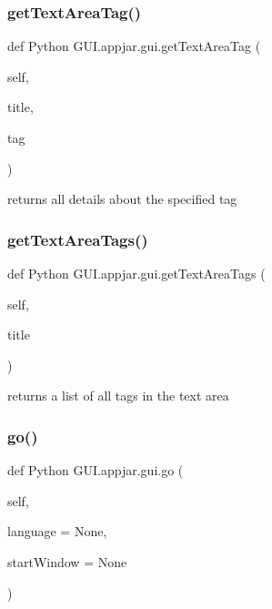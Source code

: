 \subsubsection{\texorpdfstring{get\+Text\+Area\+Tag()}{getTextAreaTag()}}
{\footnotesize\ttfamily def Python G\+U\+I.\+appjar.\+gui.\+get\+Text\+Area\+Tag (\begin{DoxyParamCaption}\item[{}]{self,  }\item[{}]{title,  }\item[{}]{tag }\end{DoxyParamCaption})}

\begin{DoxyVerb}returns all details about the specified tag \end{DoxyVerb}
 \mbox{\label{class_python_01_g_u_i_1_1appjar_1_1gui_a6fcbce0beeb322c6637cad80fe3d952b}} 
\subsubsection{\texorpdfstring{get\+Text\+Area\+Tags()}{getTextAreaTags()}}
{\footnotesize\ttfamily def Python G\+U\+I.\+appjar.\+gui.\+get\+Text\+Area\+Tags (\begin{DoxyParamCaption}\item[{}]{self,  }\item[{}]{title }\end{DoxyParamCaption})}

\begin{DoxyVerb}returns a list of all tags in the text area \end{DoxyVerb}
 \mbox{\label{class_python_01_g_u_i_1_1appjar_1_1gui_afff774610125f6dad20e8df091a9aa19}} 
\subsubsection{\texorpdfstring{go()}{go()}}
{\footnotesize\ttfamily def Python G\+U\+I.\+appjar.\+gui.\+go (\begin{DoxyParamCaption}\item[{}]{self,  }\item[{}]{language = {\ttfamily None},  }\item[{}]{start\+Window = {\ttfamily None} }\end{DoxyParamCaption})}

